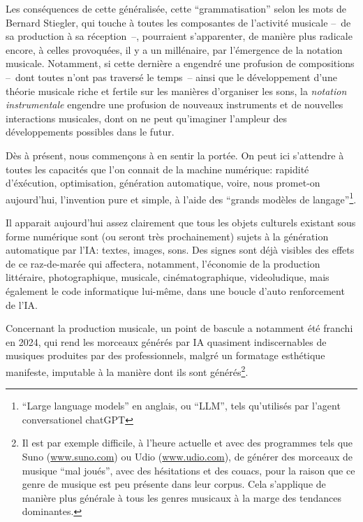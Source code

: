 \indent Les conséquences de cette  généralisée, cette ``grammatisation'' selon les mots de Bernard Stiegler, qui touche à toutes les composantes de l'activité musicale --~de sa production à sa réception~--, pourraient s'apparenter, de manière plus radicale encore, à celles provoquées, il y a un millénaire, par l'émergence de la notation musicale. Notamment, si cette dernière a engendré une profusion de compositions --~dont toutes n'ont pas traversé le temps~-- ainsi que le développement d'une théorie musicale riche et fertile sur les manières d'organiser les sons, la \textit{notation instrumentale} engendre une profusion de nouveaux instruments et de nouvelles interactions musicales, dont on ne peut qu'imaginer l'ampleur des développements possibles dans le futur.


\indent Dès à présent, nous commençons à en sentir la portée. On peut ici s'attendre à toutes les capacités que l'on connait de la machine numérique: rapidité d'éxécution, optimisation, génération automatique, voire, nous promet-on aujourd'hui, l'invention pure et simple, à l'aide des ``grands modèles de langage''\footnote{``Large language models'' en anglais, ou ``LLM'', tels qu'utilisés par l'agent conversationel chatGPT}. 

Il apparait aujourd'hui assez clairement que tous les objets culturels existant sous forme numérique sont (ou seront très prochainement) sujets à la génération automatique par l'IA: textes, images, sons. Des signes sont déjà visibles des effets de ce raz-de-marée qui affectera, notamment, l'économie de la production littéraire, photographique, musicale, cinématographique, videoludique, mais également le code informatique lui-même, dans une boucle d'auto renforcement de l'IA.

Concernant la production musicale, un point de bascule a notamment été franchi en 2024, qui rend les morceaux générés par IA quasiment indiscernables de musiques produites par des professionnels, malgré un formatage esthétique manifeste, imputable à la manière dont ils sont générés\footnote{Il est par exemple difficile, à l'heure actuelle et avec des programmes tels que Suno (\url{www.suno.com}) ou Udio (\url{www.udio.com}), de générer des morceaux de musique ``mal joués'', avec des hésitations et des couacs, pour la raison que ce genre de musique est peu présente dans leur corpus. Cela s'applique de manière plus générale à tous les genres musicaux à la marge des tendances dominantes.}.

